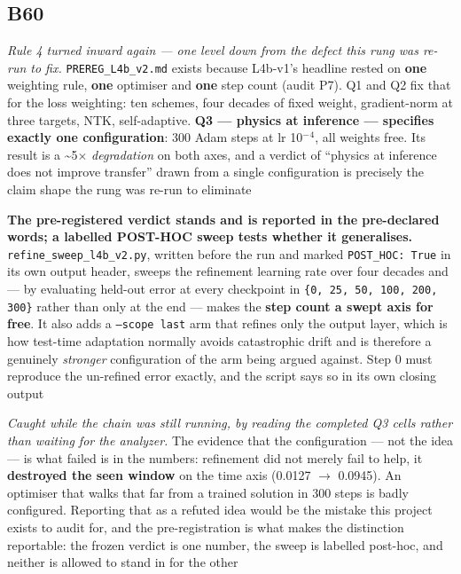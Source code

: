 \documentclass[10pt]{article}
\begin{document}
\subsection*{B60}\label{led:B60}
\begin{description}[leftmargin=0pt,itemsep=1pt]
\item[Defect.] \emph{Rule 4 turned inward again --- one level down from the defect this rung was re-run to fix.} \texttt{PREREG\_L4b\_v2.md} exists because L4b-v1's headline rested on \textbf{one} weighting rule, \textbf{one} optimiser and \textbf{one} step count (audit P7). Q1 and Q2 fix that for the loss weighting: ten schemes, four decades of fixed weight, gradient-norm at three targets, NTK, self-adaptive. \textbf{Q3 --- physics at inference --- specifies exactly one configuration}: 300 Adam steps at lr 10$^{-}$$^4$, all weights free. Its result is a \textasciitilde{}5$\times$ \emph{degradation} on both axes, and a verdict of ``physics at inference does not improve transfer'' drawn from a single configuration is precisely the claim shape the rung was re-run to eliminate
\item[Resolution.] \textbf{The pre-registered verdict stands and is reported in the pre-declared words; a labelled POST-HOC sweep tests whether it generalises.} \texttt{refine\_sweep\_l4b\_v2.py}, written before the run and marked \texttt{POST\_HOC: True} in its own output header, sweeps the refinement learning rate over four decades and --- by evaluating held-out error at every checkpoint in \texttt{\{0, 25, 50, 100, 200, 300\}} rather than only at the end --- makes the \textbf{step count a swept axis for free}. It also adds a \texttt{--scope last} arm that refines only the output layer, which is how test-time adaptation normally avoids catastrophic drift and is therefore a genuinely \emph{stronger} configuration of the arm being argued against. Step 0 must reproduce the un-refined error exactly, and the script says so in its own closing output
\item[Note.] \emph{Caught while the chain was still running, by reading the completed Q3 cells rather than waiting for the analyzer.} The evidence that the configuration --- not the idea --- is what failed is in the numbers: refinement did not merely fail to help, it \textbf{destroyed the seen window} on the time axis (0.0127 $\rightarrow$ 0.0945). An optimiser that walks that far from a trained solution in 300 steps is badly configured. Reporting that as a refuted idea would be the mistake this project exists to audit for, and the pre-registration is what makes the distinction reportable: the frozen verdict is one number, the sweep is labelled post-hoc, and neither is allowed to stand in for the other
\end{description}
\end{document}
